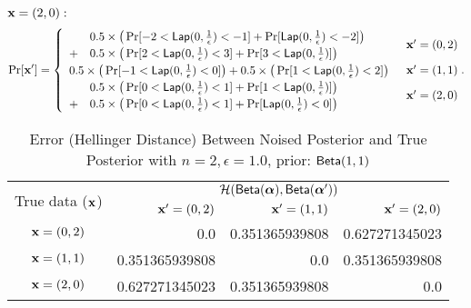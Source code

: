 \documentclass{article}
\begin{document}
{\noindent $\textbf{x} = (2,0):$
\[
\Pr[\textbf{x}']
= \begin{cases}
\begin{array}{ll}
 	& 0.5 \times 
 	\big(
 	\Pr[	-2	< \mathsf{Lap}(0, \frac{1}{\epsilon})	<	-1] 
 	+ 
 	\Pr[	\mathsf{Lap}(0, \frac{1}{\epsilon})			< 	-2] 
 	\big) \\
 	+ 	
 	& 0.5 \times 
 	\big(
 	\Pr[	2	< \mathsf{Lap}(0, \frac{1}{\epsilon})	<	3] 
 	+ 
 	\Pr[	3	< \mathsf{Lap}(0, \frac{1}{\epsilon})] 
 	\big) 
\end{array} 
	& \textbf{x}' = (0, 2)\\
\begin{array}{ll}
 	0.5 \times 
 	\big(
 	\Pr[	-1	< \mathsf{Lap}(0, \frac{1}{\epsilon})	<	0] 
 	\big)
 	+ 	
 	0.5 \times 
 	\big(
 	\Pr[	1	< \mathsf{Lap}(0, \frac{1}{\epsilon})	<	2] 
 	\big) 
\end{array}  
	& \textbf{x}' = (1, 1)\\
\begin{array}{ll}
 	& 0.5 \times 
 	\big(
 	\Pr[	0	<	\mathsf{Lap}(0, \frac{1}{\epsilon})	<	1] 
 	+ 
 	\Pr[	1	<	\mathsf{Lap}(0, \frac{1}{\epsilon})]
 	\big) \\
 	+ 	
 	& 0.5 \times 
 	\big(
 	\Pr[	0	< \mathsf{Lap}(0, \frac{1}{\epsilon})	<	1] 
 	+ 
 	\Pr[	\mathsf{Lap}(0, \frac{1}{\epsilon})			<	0] 
 	\big) 
\end{array}  
& \textbf{x}' = (2, 0)
\end{cases}.
\]
}


\begin{table}[htbp]
	\centering
	\caption{Error (Hellinger Distance) Between Noised Posterior and True Posterior with $n = 2, \epsilon = 1.0$, prior: $\mathsf{Beta}(1,1)$}
	\label{tab_n2error}
\begin{tabular}{|c||r|r|r|}
	\hline

	\multirow{2}{*}{True data ($\textbf{x}$)} 	
								& \multicolumn{3}{c|}{$\mathcal{H}(\mathsf{Beta}(\boldsymbol{\alpha}), \mathsf{Beta}(\boldsymbol{\alpha}'))$}  		
								\\ \cline{2-4}
	                      		& $\textbf{x}' = (0, 2)$
	                      		& $\textbf{x}' = (1, 1)$
	                      		& $\textbf{x}' = (2, 0)$
	                      		\\  \hline \hline
	$\textbf{x} = (0,2)$          & 0.0	
								& 0.351365939808
								& 0.627271345023 
								\\  \hline
	$\textbf{x} = (1,1)$          & 0.351365939808	
								& 0.0			
								& 0.351365939808
								\\  \hline
	$\textbf{x} = (2,0)$          & 0.627271345023
								& 0.351365939808 			
								& 0.0
								\\  \hline
\end{tabular}
\end{table}
\end{document}
